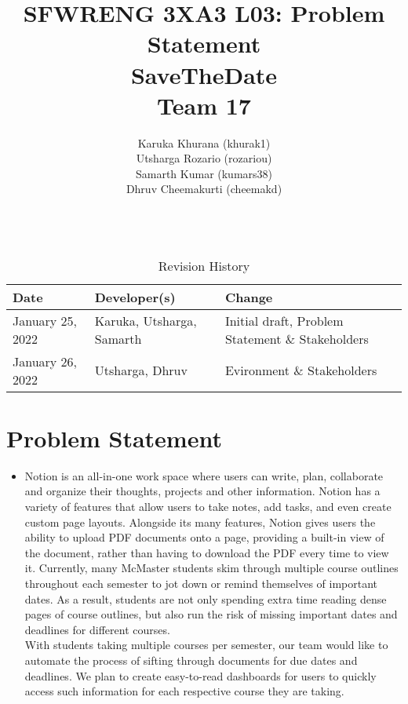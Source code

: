 \documentclass[12pt, titlepage]{article}
\title{SFWRENG 3XA3 L03: Problem Statement
        \\[1ex] \large SaveTheDate\\ Team 17}
\author{
        Karuka Khurana (khurak1)\\
        Utsharga Rozario (rozariou)\\
        Samarth Kumar (kumars38)\\
        Dhruv Cheemakurti (cheemakd)\\
        \\
}
\begin{document}
\maketitle

\tableofcontents
\listoftables
\listoffigures

\begin{table}[!hbp]
    \caption{Revision History} \label{RevisionHistory}
    \begin{tabularx}{\textwidth}{llX}
        \toprule
            \textbf{Date} & \textbf{Developer(s)} & \textbf{Change}\\
        \midrule
            January 25, 2022 & Karuka, Utsharga, Samarth & Initial draft, Problem Statement \& Stakeholders\\
            January 26, 2022 & Utsharga, Dhruv & Evironment \& Stakeholders\\
        \bottomrule
    \end{tabularx}
\end{table}

\newpage

\maketitle

\newpage
\section{Problem Statement}
\begin{itemize}
    \item[] 
    Notion is an all-in-one work space where users can write, plan, collaborate and organize their thoughts, projects and other information. Notion has a variety of features that allow users to take notes, add tasks, and even create custom page layouts. Alongside its many features, Notion gives users the ability to upload PDF documents onto a page, providing a built-in view of the document, rather than having to download the PDF every time to view it. Currently, many McMaster students skim through multiple course outlines throughout each semester to jot down or remind themselves of important dates. As a result, students are not only spending extra time reading dense pages of course outlines, but also run the risk of missing important dates and deadlines for different courses.\\ 

    With students taking multiple courses per semester, our team would like to automate the process of sifting through documents for due dates and deadlines. We plan to create easy-to-read dashboards for users to quickly access such information for each respective course they are taking.
\end{itemize}
\end{document}
